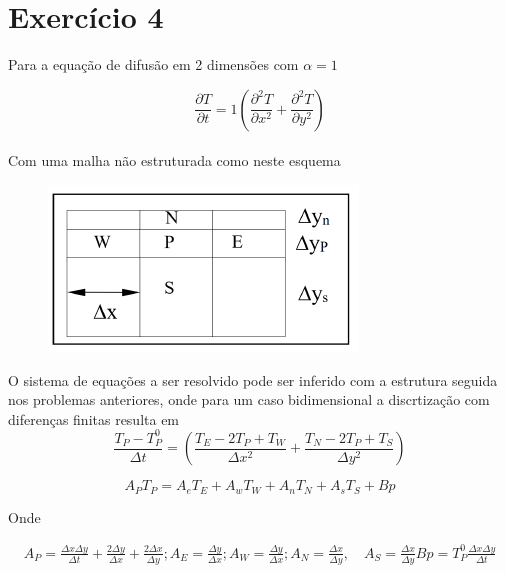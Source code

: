 \documentclass[]{article}
\begin{document}
\section*{Exercício 4}
Para a equação de difusão em 2 dimensões com $\alpha = 1$

\begin{equation}
	\frac{\partial T}{\partial t} = 1 \left( \frac{\partial^2 T}{\partial x^2} + \frac{\partial^2 T}{\partial y^2} \right)
\end{equation}\\

Com uma malha não estruturada como neste esquema

\begin{figure}[H]
	\centering
	\includegraphics[width=.65\textwidth]{figures/4-2}
	
\end{figure}


O sistema de equações a ser resolvido pode ser inferido com a estrutura seguida nos problemas anteriores, onde para um caso bidimensional a discrtização com diferenças finitas resulta em\\

\begin{equation}
	\frac{T_P - T_P^0}{\Delta t} =
	\left(
	\frac{T_E - 2T_P + T_W}{\Delta x^2} +
	\frac{T_N - 2T_P + T_S}{\Delta y^2}
	\right)
\end{equation}

\begin{equation}
	A_P T_P = A_e T_E + A_w T_W + A_n T_N + A_s T_S + Bp
\end{equation}


Onde

\begin{align*}
	A_P = \frac{\Delta x \Delta y}{\Delta t} + \frac{2 \Delta y}{\Delta x} + \frac{2 \Delta x}{\Delta y} ;A_E = \frac{\Delta y}{\Delta x}; A_W = \frac{\Delta y}{\Delta x};A_N = \frac{\Delta x}{\Delta y}, \quad A_S = \frac{\Delta x}{\Delta y} Bp = T_P^0 \frac{\Delta x \Delta y}{\Delta t}
\end{align*}
\end{document}
